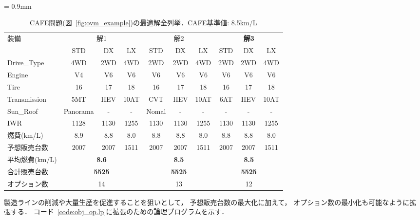 \begin{table*}[htbp]
  \caption{CAFE問題(図~\ref{fig:ovm_example})の最適解全列挙．CAFE基準値: 8.5km/L}
  \centering
  \tabcolsep = 0.9mm
  \begin{tabular}{l|c|c|c||c|c|c||c|c|c} \bhline
    装備 & \multicolumn{3}{c||}{解1} & \multicolumn{3}{c||}{解2} & \multicolumn{3}{c}{\bf{解3}}\\ \cline{2-10}
         & STD	& DX 	 & LX	   & STD & DX  & LX    & STD & DX  & LX       \\  \hline
    Drive\_Type  & 4WD  & 2WD    & 4WD     & 2WD & 2WD & 4WD   & 2WD & 2WD & 4WD     \\
    Engine	 & V4	& V6	 & V6	   & V6  & V6  & V6    & V6  & V6  & V6      \\ 
    Tire	 & 16	& 17	 & 18	   & 16  & 17  & 18    & 16  & 17  & 18     \\
    Transmission & 5MT	& HEV    & 10AT	   & CVT & HEV & 10AT  & 6AT & HEV & 10AT     \\
    Sun\_Roof    & Panorama& -   & -       & Nomal& -  & -     & -   & -   & -       \\ \hline
    IWR          & 1128 & 1130   & 1255    & 1130 & 1130&1255  & 1130& 1130& 1255     \\ %
    燃費(km/L)    & 8.9 & 8.8    & 8.0     & 8.8 & 8.8  & 8.0 & 8.8  & 8.8  & 8.0         \\ %
    予想販売台数  & 2007  & 2007   & 1511   & 2007 & 2007 & 1511 & 2007& 2007& 1511       \\ \hline
    平均燃費(km/L) & \multicolumn{3}{c||}{\bf{8.6}} & \multicolumn{3}{c||}{\bf{8.5}} & \multicolumn{3}{c}{\bf{8.5}}\\ 
    合計販売台数  & \multicolumn{3}{c||}{\bf{5525}} & \multicolumn{3}{c||}{\bf{5525}}  &\multicolumn{3}{c}{\bf{5525}}\\
    オプション数  & \multicolumn{3}{c||}{14} & \multicolumn{3}{c||}{13}  &\multicolumn{3}{c}{12}\\ \hline
  \end{tabular}
  \label{tab:optN}
\end{table*}

製造ラインの削減や大量生産を促進することを狙いとして，
予想販売台数の最大化に加えて，
オプション数の最小化も可能なように拡張する．
コード~\ref{code:obj_op.lp}に拡張のための論理プログラムを示す．

